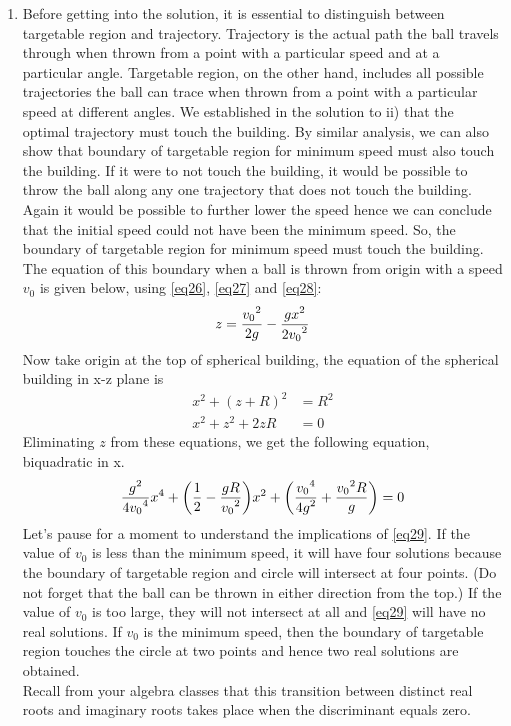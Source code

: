 \begin{enumerate} [label=\roman*]
\item Before getting into the solution, it is essential to distinguish between targetable region and trajectory. Trajectory is the actual path the ball travels through when thrown from a point with a particular speed and at a particular angle. Targetable region, on the other hand, includes all possible trajectories the ball can trace when thrown from a point with a particular speed at different angles. We established in the solution to ii) that the optimal trajectory must touch the building. By similar analysis, we can also show that boundary of targetable region for minimum speed must also touch the building. If it were to not touch the building, it would be possible to throw the ball along any one trajectory that does not touch the building. Again it would be possible to further lower the speed hence we can conclude that the initial speed could not have been the minimum speed. So, the boundary of targetable region for minimum speed must touch the building. The equation of this boundary when a ball is thrown from origin with a speed $v_0$ is given below, using \eqref{eq26}, \eqref{eq27} and \eqref{eq28}:
\begin{equation*}
z=\frac{\displaystyle {v_0}^2}{\displaystyle 2g}-\frac{\displaystyle gx^2}{\displaystyle 2{v_0}^2}
\end{equation*}
Now take origin at the top of spherical building, the equation of the spherical building in x-z plane is
\begin{align*}
x^2+(z+R)^2&=R^2\\
x^2+z^2+2zR&=0
\end{align*}
Eliminating $z$ from these equations, we get the following equation, biquadratic in x.
\begin{equation} \label{eq29}
\frac{\displaystyle g^2}{\displaystyle 4{v_0}^4}x^4+\biggl(\frac{\displaystyle 1}{\displaystyle 2}-\frac{\displaystyle gR}{\displaystyle {v_0}^2}\biggr)x^2+\biggl(\frac{\displaystyle {v_0}^4}{\displaystyle 4g^2}+\frac{\displaystyle {v_0}^2R}{\displaystyle g}\biggr)=0
\end{equation}
Let's pause for a moment to understand the implications of \eqref{eq29}. If the value of $v_0$ is less than the minimum speed, it will have four solutions because the boundary of targetable region and circle will intersect at four points. (Do not forget that the ball can be thrown in either direction from the top.) If the value of $v_0$ is too large, they will not intersect at all and \eqref{eq29} will have no real solutions. If $v_0$ is the minimum speed, then the boundary of targetable region touches the circle at two points and hence two real solutions are obtained. \\
Recall from your algebra classes that this transition between distinct real roots and imaginary roots takes place when the discriminant equals zero.

\end{enumerate}
